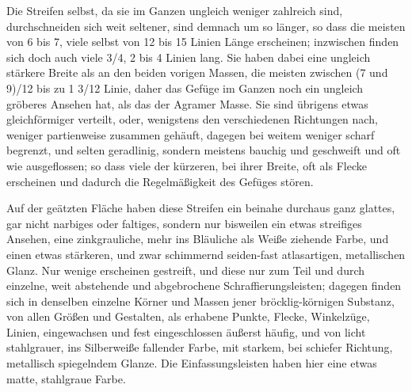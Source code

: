 \documentclass[a4paper, 11pt, oneside, german]{article}
\begin{document}
Die Streifen selbst, da sie im Ganzen ungleich weniger zahlreich sind, durchschneiden sich weit seltener, sind demnach um so länger, so dass die meisten von 6 bis 7, viele selbst von 12 bis 15 Linien Länge erscheinen; inzwischen finden sich doch auch viele 3/4, 2 bis 4 Linien lang. Sie haben dabei eine ungleich stärkere Breite als an den beiden vorigen Massen, die meisten zwischen (7 und 9)/12 bis zu 1 3/12 Linie, daher das Gefüge im Ganzen noch ein ungleich gröberes Ansehen hat, als das der Agramer Masse. Sie sind übrigens etwas gleichförmiger verteilt, oder, wenigstens den verschiedenen Richtungen nach, weniger partienweise zusammen gehäuft, dagegen bei weitem weniger scharf begrenzt, und selten geradlinig, sondern meistens bauchig und geschweift und oft wie ausgeflossen; so dass viele der kürzeren, bei ihrer Breite, oft als Flecke erscheinen und dadurch die Regelmäßigkeit des Gefüges stören.

Auf der geätzten Fläche haben diese Streifen ein beinahe durchaus ganz glattes, gar nicht narbiges oder faltiges, sondern nur bisweilen ein etwas streifiges Ansehen, eine zinkgrauliche, mehr ins Bläuliche als Weiße ziehende Farbe, und einen etwas stärkeren, und zwar schimmernd seiden-fast atlasartigen, metallischen Glanz. Nur wenige erscheinen gestreift, und diese nur zum Teil und durch einzelne, weit abstehende und abgebrochene Schraffierungsleisten; dagegen finden sich in denselben einzelne Körner und Massen jener bröcklig-körnigen Substanz, von allen Größen und Gestalten, als erhabene Punkte, Flecke, Winkelzüge, Linien, eingewachsen und fest eingeschlossen äußerst häufig, und von licht stahlgrauer, ins Silberweiße fallender Farbe, mit starkem, bei schiefer Richtung, metallisch spiegelndem Glanze. Die Einfassungsleisten haben hier eine etwas matte, stahlgraue Farbe.
\end{document}
